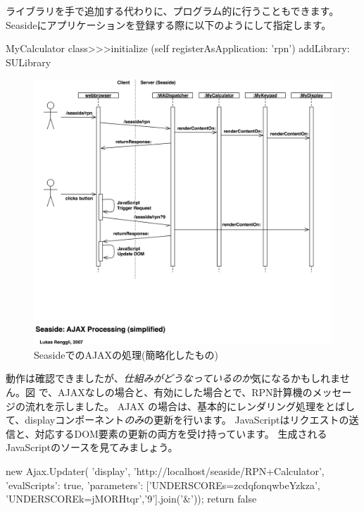 \documentclass[a4paper,10pt,twoside]{book}
\begin{document}
ライブラリを手で追加する代わりに、プログラム的に行うこともできます。Seasideにアプリケーションを登録する際に以下のようにして指定します。

\begin{code}{}
MyCalculator class>>>initialize
	(self registerAsApplication: 'rpn')
		addLibrary: SULibrary
\end{code}

\begin{figure}[ht]
\begin{center}
\includegraphics[width=\textwidth]{ajax-processing}
\caption{SeasideでのAJAXの処理(簡略化したもの)}
\end{center}
\end{figure}


動作は確認できましたが、\emph{仕組みがどうなっているのか}気になるかもしれません。図 で、AJAXなしの場合と、有効にした場合とで、RPN計算機のメッセージの流れを示しました。
AJAX の場合は、基本的にレンダリング処理をとばして、displayコンポーネント\emph{のみ}の更新を行います。
JavaScriptはリクエストの送信と、対応するDOM要素の更新の両方を受け持っています。
生成されるJavaScriptのソースを見てみましょう。

\begin{code}{}
new Ajax.Updater(
	'display',
	'http://localhost/seaside/RPN+Calculator',
	{'evalScripts': true,
	  'parameters': ['UNDERSCOREs=zcdqfonqwbeYzkza', 'UNDERSCOREk=jMORHtqr','9'].join('&')});
return false
\end{code}
\end{document}
